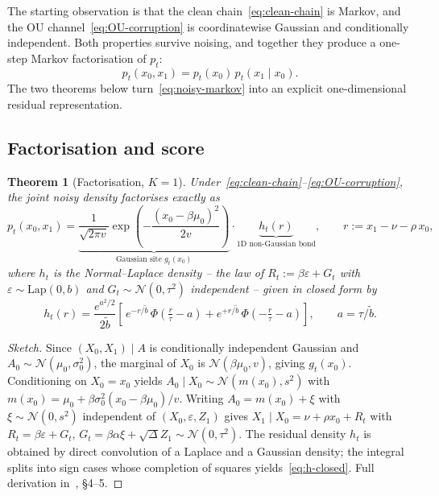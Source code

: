 \documentclass[11pt,a4paper]{article}
\theoremstyle{plainserif}
\newtheorem{theorem}{Theorem}
\theoremstyle{definition}
\theoremstyle{remarkstyle}
\newcommand{\Normal}{\mathcal{N}}
\newcommand{\Lap}{\mathrm{Lap}}
\newcommand{\btilde}{\tilde{b}}
\begin{document}
The starting observation is that the clean chain~\eqref{eq:clean-chain} is
Markov, and the OU channel~\eqref{eq:OU-corruption} is coordinatewise
Gaussian and conditionally independent. Both properties survive noising,
and together they produce a one-step Markov factorisation of $p_t$:
\begin{equation}
p_t(x_0, x_1) = p_t(x_0)\, p_t(x_1 \mid x_0).
\label{eq:noisy-markov}
\end{equation}
The two theorems below turn~\eqref{eq:noisy-markov} into an explicit one-dimensional
residual representation.

\subsection{Factorisation and score}

\begin{theorem}[Factorisation, $K{=}1$]
\label{thm:fact}
Under~\eqref{eq:clean-chain}--\eqref{eq:OU-corruption}, the joint noisy
density factorises exactly as
\begin{equation}
p_t(x_0, x_1)
= \underbrace{\frac{1}{\sqrt{2\pi v}}\exp\!\left(-\frac{(x_0-\beta\mu_0)^2}{2v}\right)}_{\text{Gaussian site } g_t(x_0)}
\cdot
\underbrace{h_t(r)}_{\text{1D non-Gaussian bond}},
\qquad r := x_1 - \nu - \rho\, x_0,
\label{eq:factorisation}
\end{equation}
where $h_t$ is the Normal--Laplace density -- the law of
$R_t := \beta\varepsilon + G_t$ with $\varepsilon \sim \Lap(0,b)$ and
$G_t \sim \Normal(0,\tau^2)$ independent -- given in closed form by
\begin{equation}
h_t(r) = \frac{e^{a^2/2}}{2\btilde}
\left[\, e^{-r/\btilde}\,\Phi\!\left(\tfrac{r}{\tau}-a\right)
    + e^{+r/\btilde}\,\Phi\!\left(-\tfrac{r}{\tau}-a\right)\right],
\qquad a = \tau/\btilde.
\label{eq:h-closed}
\end{equation}
\end{theorem}

\begin{proof}[Sketch]
Since $(X_0, X_1)\mid A$ is conditionally independent Gaussian and
$A_0 \sim \Normal(\mu_0,\sigma_0^2)$, the marginal of $X_0$ is
$\Normal(\beta\mu_0, v)$, giving $g_t(x_0)$. Conditioning on $X_0 = x_0$
yields
$A_0 \mid X_0 \sim \Normal(m(x_0), s^2)$ with $m(x_0) = \mu_0 + \beta\sigma_0^2 (x_0-\beta\mu_0)/v$.
Writing $A_0 = m(x_0) + \xi$ with $\xi \sim \Normal(0,s^2)$ independent of
$(X_0,\varepsilon,Z_1)$ gives
$X_1 \mid X_0 = \nu + \rho x_0 + R_t$ with
$R_t = \beta\varepsilon + G_t$, $G_t = \beta\alpha\xi + \sqrt{\Delta}Z_1 \sim \Normal(0,\tau^2)$.
The residual density $h_t$ is obtained by direct convolution of a Laplace
and a Gaussian density; the integral splits into sign cases whose
completion of squares yields~\eqref{eq:h-closed}. Full derivation
in~\cite{laplace_note}, \S4--5.
\end{proof}
\end{document}
